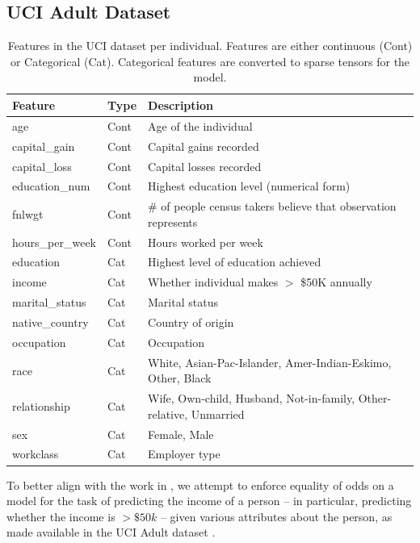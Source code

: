 \documentclass[letterpaper]{article} %
\newcommand{\incite}[1]{\citeauthor{#1} \shortcite{#1}}
\theoremstyle{definition}
\begin{document}
\subsection{UCI Adult Dataset}\label{subsec:uci}

\begin{table}
    \centering
    \small
    \begin{tabular}{@{ }l@{ }|@{\hspace{.25em}}l@{\hspace{.25em}}|@{\hspace{.4em}}p{16em}} %
    {\bf Feature} & {\bf Type} &  {\bf Description} \\\hline
age	& Cont & Age of the individual\\
capital\_gain& Cont& Capital gains recorded\\
capital\_loss& Cont& Capital losses recorded\\
education\_num& Cont& Highest education level (numerical form)\\
fnlwgt& Cont& \# of people census takers believe that observation represents\\
hours\_per\_week& Cont& Hours worked per week\\\hline
education& Cat& Highest level of education achieved\\
income& 	Cat& Whether individual makes $>$ \$50K annually   \\
marital\_status& Cat& Marital status\\
native\_country& Cat& Country of origin\\
occupation& Cat& Occupation \\
race& Cat& White, Asian-Pac-Islander, Amer-Indian-Eskimo, Other, Black\\
relationship& Cat& Wife, Own-child, Husband, Not-in-family, Other-relative, Unmarried\\
sex& Cat& Female, Male\\
workclass&  Cat& Employer type \\
 \end{tabular}
    \caption{Features in the UCI dataset per individual.  Features are either continuous (Cont) or Categorical (Cat).  Categorical features are converted to sparse tensors for the model.}
    \label{tab:uci}
\end{table}

To better align with the work in \incite{beutel2017data}, we attempt to enforce {\sc equality of odds} on a model for the task of predicting the income of a person -- in particular, predicting whether the income is $>\$50k$ -- given various attributes about the person, as made available in the UCI Adult dataset \cite{asuncion2007uci}.
\end{document}
